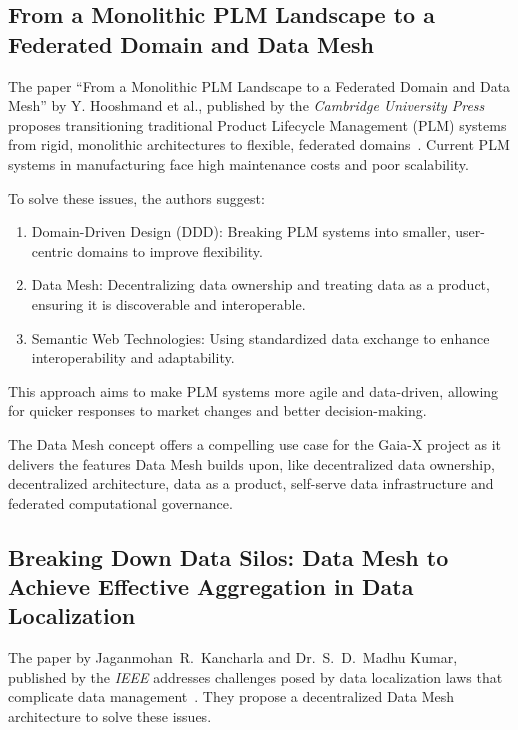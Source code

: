 \subsection{From a Monolithic PLM Landscape to a Federated Domain and Data Mesh}\label{subsec:from-a-monolithic-plm-landscape-to-a-federated-domain-and-data-mesh}

The paper ``From a Monolithic PLM Landscape to a Federated Domain and Data Mesh'' by Y. Hooshmand et al., published by the \textit{Cambridge University Press} proposes transitioning traditional Product Lifecycle Management (PLM) systems from rigid, monolithic architectures to flexible, federated domains~\cite{from_monolithic_plm_to_federated}.
Current PLM systems in manufacturing face high maintenance costs and poor scalability.

To solve these issues, the authors suggest:

\begin{enumerate}
    \item Domain-Driven Design (DDD): Breaking PLM systems into smaller, user-centric domains to improve flexibility.
    \item Data Mesh: Decentralizing data ownership and treating data as a product, ensuring it is discoverable and interoperable.
    \item Semantic Web Technologies: Using standardized data exchange to enhance interoperability and adaptability.
\end{enumerate}
This approach aims to make PLM systems more agile and data-driven, allowing for quicker responses to market changes and better decision-making.

The Data Mesh concept offers a compelling use case for the Gaia-X project as it delivers the features Data Mesh builds upon, like decentralized data ownership, decentralized architecture, data as a product, self-serve data infrastructure and federated computational governance.

\subsection{Breaking Down Data Silos: Data Mesh to Achieve Effective Aggregation in Data Localization}\label{subsec:breaking-down-data-silos:-data-mesh-to-achieve-effective-aggregation-in-data-localization}

The paper by Jaganmohan~R.~Kancharla and Dr.~S.~D.~Madhu Kumar, published by the \textit{IEEE} addresses challenges posed by data localization laws that complicate data management~\cite{breaking_down_data_silos}.
They propose a decentralized Data Mesh architecture to solve these issues.

